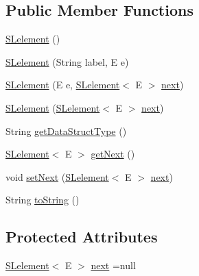 \subsection*{Public Member Functions}
\begin{DoxyCompactItemize}
\item 
\hyperlink{classbridges_1_1base_1_1_s_lelement_ab9c8a08dadd76d7e0c29d7c41cf277c4}{S\+Lelement} ()
\item 
\hyperlink{classbridges_1_1base_1_1_s_lelement_a8e32c9b9e8fc8f9f1eccb14b97e031e7}{S\+Lelement} (String label, E e)
\item 
\hyperlink{classbridges_1_1base_1_1_s_lelement_abc5e333fd2f3289eede108175908f97d}{S\+Lelement} (E e, \hyperlink{classbridges_1_1base_1_1_s_lelement}{S\+Lelement}$<$ E $>$ \hyperlink{classbridges_1_1base_1_1_s_lelement_abf61c96a74ad319d561c6952ea388e0e}{next})
\item 
\hyperlink{classbridges_1_1base_1_1_s_lelement_ab5b1c20ba1d1923fad0780052fb51c99}{S\+Lelement} (\hyperlink{classbridges_1_1base_1_1_s_lelement}{S\+Lelement}$<$ E $>$ \hyperlink{classbridges_1_1base_1_1_s_lelement_abf61c96a74ad319d561c6952ea388e0e}{next})
\item 
String \hyperlink{classbridges_1_1base_1_1_s_lelement_a8c48a2d34b238fa0ae7bf2d1ee58ea88}{get\+Data\+Struct\+Type} ()
\item 
\hyperlink{classbridges_1_1base_1_1_s_lelement}{S\+Lelement}$<$ E $>$ \hyperlink{classbridges_1_1base_1_1_s_lelement_a060c4671e05e3f20b16630343393b80d}{get\+Next} ()
\item 
void \hyperlink{classbridges_1_1base_1_1_s_lelement_afdd42f03071b2614822b73729e1a5a1a}{set\+Next} (\hyperlink{classbridges_1_1base_1_1_s_lelement}{S\+Lelement}$<$ E $>$ \hyperlink{classbridges_1_1base_1_1_s_lelement_abf61c96a74ad319d561c6952ea388e0e}{next})
\item 
String \hyperlink{classbridges_1_1base_1_1_s_lelement_af0ec4da5b29d0f5ab6ab38e91cca51f9}{to\+String} ()
\end{DoxyCompactItemize}
\subsection*{Protected Attributes}
\begin{DoxyCompactItemize}
\item 
\hyperlink{classbridges_1_1base_1_1_s_lelement}{S\+Lelement}$<$ E $>$ \hyperlink{classbridges_1_1base_1_1_s_lelement_abf61c96a74ad319d561c6952ea388e0e}{next} =null
\end{DoxyCompactItemize}
